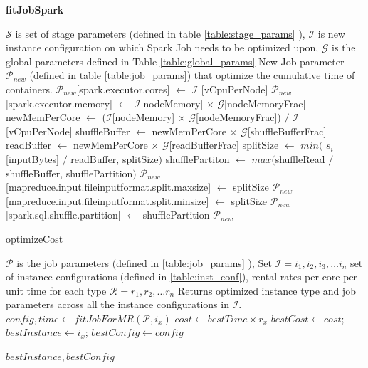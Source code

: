 \renewcommand{\algorithmicrequire}{\textbf{Input:}}
\renewcommand{\algorithmicensure}{\textbf{Output:}}
\renewcommand{\algorithmiccomment}[1]{// #1}
\begin{algorithm}
\caption{\textbf{fitJobSpark}}\label{jobfitspark}
\begin{algorithmic}[1]
\footnotesize
\REQUIRE  $\mathcal{S}$ is set of stage parameters (defined in table \ref{table:stage_params} ), $\mathcal{I}$ is new instance configuration on which Spark Job needs to be optimized upon, $\mathcal{G}$ is the global parameters defined in Table \ref{table:global_params}
\ENSURE New Job parameter $\mathcal{P}_{new}$ (defined in table \ref{table:job_params}) that optimize the cumulative time of containers.
\STATE $\mathcal{P}_{new}$[spark.executor.cores] $\gets$ $\mathcal{I}$ [vCpuPerNode]
\STATE $\mathcal{P}_{new}$[spark.executor.memory] $\gets$ $\mathcal{I}$[nodeMemory] $\times$ $\mathcal{G}$[nodeMemoryFrac]
\STATE newMemPerCore $\gets$ ($\mathcal{I}$[nodeMemory] $\times$ $\mathcal{G}$[nodeMemoryFrac]) $/$ $\mathcal{I}$[vCpuPerNode]
\STATE shuffleBuffer $\gets$ newMemPerCore $\times$ $\mathcal{G}$[shuffleBufferFrac]
\STATE readBuffer $\gets$ newMemPerCore $\times$ $\mathcal{G}$[readBufferFrac]
\STATE splitSize $\gets$ $min($ $s_{i}$[inputBytes] $/$  readBuffer, splitSize$)$ 
\STATE shufflePartiton $\gets$ $max($shuffleRead $/$ shuffleBuffer, shufflePartition$)$
\ENDFOR
\STATE $\mathcal{P}_{new}$[mapreduce.input.fileinputformat.split.maxsize] $\gets$ splitSize
\STATE $\mathcal{P}_{new}$[mapreduce.input.fileinputformat.split.minsize] $\gets$ splitSize
\STATE $\mathcal{P}_{new}$[spark.sql.shuffle.partition] $\gets$ shufflePartition
\STATE \RETURN $\mathcal{P}_{new}$
\end{algorithmic}
\end{algorithm}

\begin{algorithm}
\caption{optimizeCost} \label{cost_optimize}
\begin{algorithmic}[1]
\footnotesize
\REQUIRE $\mathcal{P}$ is the job parameters (defined in \ref{table:job_params} ), Set $\mathcal{I} = {i_1, i_2, i_3, \ldots i_n} $ set of instance configurations (defined in \ref{table:inst_conf}), rental rates per core per unit time for each type $\mathcal{R}={r_1, r_2, \ldots r_n}$
\ENSURE Returns optimized instance type and job parameters across all the instance configurations in $\mathcal{I}$.
	\STATE $config, time \gets fitJobForMR(\mathcal{P}, i_x)$
	\STATE $cost \gets  bestTime \times r_x$  
		\STATE $bestCost \gets cost$;
		$bestInstance \gets i_x$;
		$bestConfig \gets config$
	\ENDIF
\ENDFOR

\RETURN $bestInstance, bestConfig$
\end{algorithmic}
\end{algorithm}

